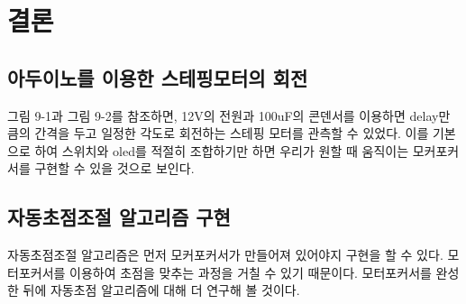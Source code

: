 \section{결론}

\subsection{아두이노를 이용한 스테핑모터의 회전}

그림 9-1과 그림 9-2를 참조하면, 12V의 전원과 100uF의 콘덴서를 이용하면 delay만큼의 간격을 두고 일정한 각도로 회전하는 스테핑 모터를 관측할 수 있었다. 이를 기본으로 하여 스위치와 oled를 적절히 조합하기만 하면 우리가 원할 때 움직이는 모커포커서를 구현할 수 있을 것으로 보인다.

\subsection{자동초점조절 알고리즘 구현}

자동초점조절 알고리즘은 먼저 모커포커서가 만들어져 있어야지 구현을 할 수 있다. 모터포커서를 이용하여 초점을 맞추는 과정을 거칠 수 있기 때문이다. 모터포커서를 완성한 뒤에 자동초점 알고리즘에 대해 더 연구해 볼 것이다.
